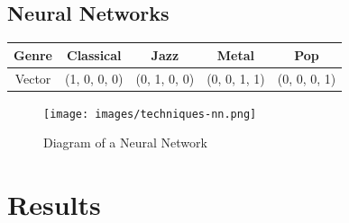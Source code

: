 \documentclass{article} %
\begin{document}
\subsection{Neural Networks}



\begin{center}
\begin{tabular}{| c | c | c | c | c |}
\hline
Genre & Classical & Jazz & Metal & Pop \\
\hline
Vector & (1, 0, 0, 0) & (0, 1, 0, 0) & (0, 0, 1, 1) & (0, 0, 0, 1) \\
\hline
\end{tabular}
\end{center}



\begin{figure}[!hb]
  \centering
  \texttt{[image: images/techniques-nn.png]}
  \caption{Diagram of a Neural Network}
  \label{fig:nn}
\end{figure}

\section{Results}
\end{document}
